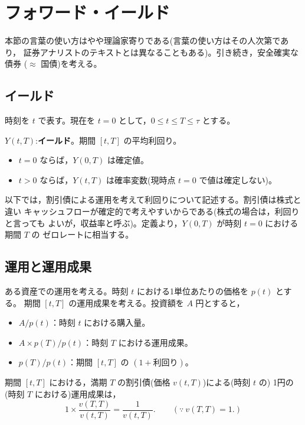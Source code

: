 \vspace{18pt}

\section{フォワード・イールド}

本節の言葉の使い方はやや理論家寄りである(言葉の使い方はその人次第であり，
証券アナリストのテキストとは異なることもある)。引き続き，安全確実な債券
($\approx$ 国債)を考える。

\subsection{イールド}

時刻を $t$ で表す。現在を $t=0$ として，$0 \le t \le T \le \tau$ とする。

\begin{definition}[イールド]
$Y(t,T)$:\textbf{イールド}。期間 $[t,T]$ の平均利回り。
\begin{itemize}
\item $t=0$ ならば，$Y(0,T)$ は確定値。
\item $t>0$ ならば，$Y(t,T)$ は確率変数(現時点 $t=0$ で値は確定しない)。
\end{itemize}
\end{definition}

以下では，割引債による運用を考えて利回りについて記述する。割引債は株式と違い
キャッシュフローが確定的で考えやすいからである(株式の場合は，利回りと言っても
よいが，収益率と呼ぶ)。定義より，$Y(0,T)$ が時刻 $t=0$ における期間 $T$ の
ゼロレートに相当する。

\subsection{運用と運用成果}

ある資産での運用を考える。時刻 $t$ における1単位あたりの価格を $p(t)$ とする。
期間 $[t,T]$ の運用成果を考える。投資額を $A$ 円とすると，
\begin{itemize}
\item $A / p(t)$：時刻 $t$ における購入量。
\item $A \times p(T)/p(t)$：時刻 $T$ における運用成果。
\item $p(T)/p(t)$：期間 $[t,T]$ の $(1+\text{利回り})$。
\end{itemize}

\begin{example}
期間 $[t,T]$ における，満期 $T$ の割引債(価格 $v(t,T)$)による(時刻 $t$ の)
1円の(時刻 $T$ における)運用成果は，
\[
1 \times \frac{v(T,T)}{v(t,T)} = \frac{1}{v(t,T)}.
\qquad(\because\ v(T,T)=1.)
\]
\end{example}

